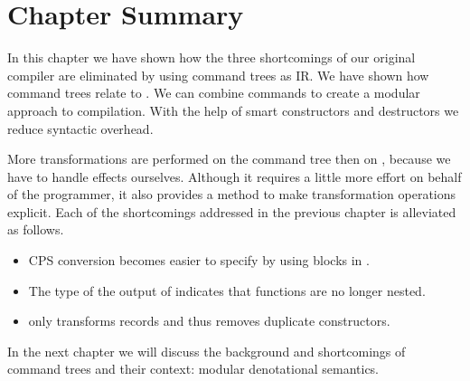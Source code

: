 \begin{lstlisting}[language=Haskell]
\end{lstlisting}

\section{\label{section:summarytree}Chapter Summary}
In this chapter we have shown how the three shortcomings of our original compiler are eliminated by using command trees as IR. We have shown how command trees relate to . We can combine commands to create a modular approach to compilation. With the help of smart constructors and destructors we reduce syntactic overhead.

More transformations are performed on the command tree then on , because we have to handle effects ourselves. Although it requires a little more effort on behalf of the programmer, it also provides a method to make transformation operations explicit. Each of the shortcomings addressed in the previous chapter is alleviated as follows.

\begin{itemize}
\item CPS conversion becomes easier to specify by using blocks in .
\item The type of the output of  indicates that functions are no longer nested.
\item {} only transforms records and thus removes duplicate constructors.
\end{itemize}

In the next chapter we will discuss the background and shortcomings of command trees and their context: modular denotational semantics.
